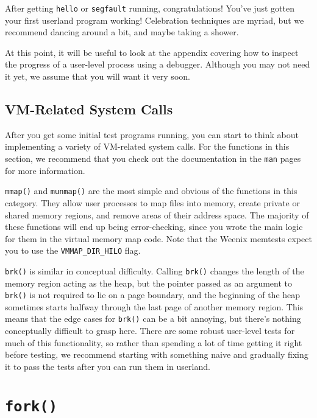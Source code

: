 After getting \texttt{hello} or \texttt{segfault} running, congratulations! You've just gotten your first userland program working! Celebration techniques are myriad, but we recommend dancing around a bit, and maybe taking a shower.

At this point, it will be useful to look at the  appendix covering how to inspect the progress of a user-level process using a debugger. Although you may not need it yet, we assume that you will want it very soon.

\subsection{VM-Related System Calls}

After you get some initial test programs running, you can start to think about implementing a variety of VM-related system calls. For the functions in this section, we recommend that you check out the documentation in the \texttt{man} pages for more information.

\texttt{mmap()} and \texttt{munmap()} are the most simple and obvious of the functions in this category. They allow user processes to map files into memory, create private or shared memory regions, and remove areas of their address space. The majority of these functions will end up being error-checking, since you wrote the main logic for them in the virtual memory map code.  Note that the Weenix memtests expect you to use the \texttt{VMMAP\_DIR\_HILO} flag.

\texttt{brk()} is similar in conceptual difficulty. Calling \texttt{brk()} changes the length of the memory region acting as the heap, but the pointer passed as an argument to \texttt{brk()} is not required to lie on a page boundary, and the beginning of the heap sometimes starts halfway through the last page of another memory region. This means that the edge cases for \texttt{brk()} can be a bit annoying, but there's nothing conceptually difficult to grasp here. There are some robust user-level tests for much of this functionality, so rather than spending a lot of time getting it right before testing, we recommend starting with something naive and gradually fixing it to pass the tests after you can run them in userland.

\section{\texttt{fork()}}

